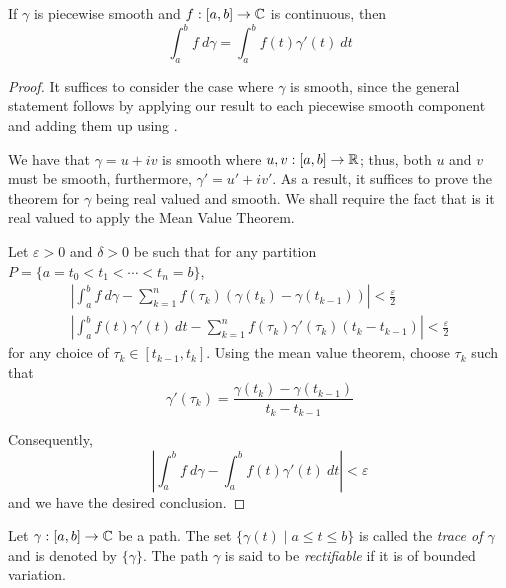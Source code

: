 \begin{theorem}
    If $\gamma$ is piecewise smooth and $f: [a,b]\to\mathbb{C}$ is continuous, then 
    \begin{equation*}
        \int_a^b f~d\gamma = \int_a^b f(t)\gamma'(t)~dt
    \end{equation*}
\end{theorem}
\begin{proof}
    It suffices to consider the case where $\gamma$ is smooth, since the general statement follows by applying our result to each piecewise smooth component and adding them up using .

    We have that $\gamma = u + iv$ is smooth where $u,v: [a,b]\to\mathbb{R}$; thus, both $u$ and $v$ must be smooth, furthermore, $\gamma' = u' + iv'$. As a result, it suffices to prove the theorem for $\gamma$ being real valued and smooth. We shall require the fact that is it real valued to apply the Mean Value Theorem.

    Let $\varepsilon > 0$ and $\delta > 0$ be such that for any partition $P = \{a = t_0 < t_1 < \cdots < t_n = b\}$, 
    \begin{align*}
        \left|\int_a^b f~d\gamma - \sum_{k = 1}^n f(\tau_k)(\gamma(t_k) - \gamma(t_{k - 1}))\right| < \frac{\varepsilon}{2}\\
        \left|\int_a^b f(t)\gamma'(t)~dt - \sum_{k = 1}^n f(\tau_k)\gamma'(\tau_k)(t_k - t_{k - 1})\right| < \frac{\varepsilon}{2}
    \end{align*}
    for any choice of $\tau_k\in [t_{k - 1}, t_k]$. Using the mean value theorem, choose $\tau_k$ such that 
    \begin{equation*}
        \gamma'(\tau_k) = \frac{\gamma(t_k) - \gamma(t_{k - 1})}{t_k -  t_{k - 1}}
    \end{equation*}

    Consequently, 
    \begin{equation*}
        \left|\int_a^b f~d\gamma - \int_a^b f(t)\gamma'(t)~dt\right| < \varepsilon
    \end{equation*}
    and we have the desired conclusion.
\end{proof}

\begin{definition}
    Let $\gamma: [a,b]\to\mathbb{C}$ be a path. The set $\{\gamma(t)\mid a\le t\le b\}$ is called the \textit{trace of $\gamma$} and is denoted by $\{\gamma\}$. The path $\gamma$ is said to be \textit{rectifiable} if it is of bounded variation.
\end{definition}

